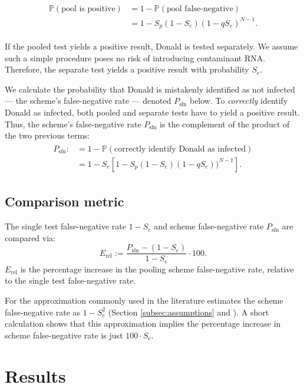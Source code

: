 \documentclass{article}
\newcommand{\Se}{S_e}
\newcommand{\Sp}{S_p}
\newcommand{\mi}{P_{\text{sfn}}}
\newcommand{\rel}{E_{\text{rel}}}
\renewcommand{\Pr}{\mathbb{P}}
\begin{document}
\begin{align}
    \begin{split}
        \Pr(\text{pool is positive}) &= 1 - \Pr(\text{pool false-negative}) \\
        &= 1 - \Sp(1-\Se)(1-q\Se)^{N-1}.
    \end{split}
\end{align}

If the pooled test yields a positive result, Donald is tested separately. We assume such a simple procedure poses no risk of introducing contaminant RNA. Therefore, the separate test yields a positive result with probability $\Se$. 

We calculate the probability that Donald is mistakenly identified as not infected --- the scheme's false-negative rate --- denoted $\mi$ below. To \emph{correctly} identify Donald as infected, both pooled and separate tests have to yield a positive result. Thus, the scheme's false-negative rate $\mi$ is the complement of the product of the two previous terms:
\begin{align}\label{eq:sfn}
    \begin{split}
        \mi :&= 1-\Pr(\text{correctly identify Donald as infected})\\
        &= 1 - \Se\left [1 - \Sp(1-\Se)(1-q\Se))^{N-1}\right].
    \end{split}
\end{align}

\subsection{Comparison metric}
The single test false-negative rate $1-\Se$ and scheme false-negative rate $\mi$ are compared via:
\begin{equation}\label{eq:erel}
\rel := \frac{\mi - (1-\Se)}{1-\Se} \cdot 100.
\end{equation}
$\rel$ is the percentage increase in the pooling scheme false-negative rate, relative to the single test false-negative rate.

For the approximation commonly used in the literature estimates the scheme false-negative rate as $1-\Se^2$ (Section \ref{subsec:assumptions} and \cite{Simplistic1, Simplistic2, Kim, OptimalDorfmanPool}). A short calculation shows that this approximation implies the percentage increase in scheme false-negative rate is just $100\cdot \Se$.

\section{Results}\label{section:results}
\end{document}

